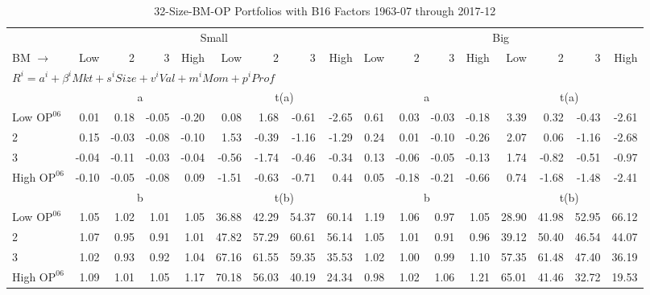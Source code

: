 
\begin{table}[!ht]
\footnotesize
\centering
\caption{32-Size-BM-OP Portfolios with B16 Factors 1963-07 through 2017-12}
\begin{tabular}{lrrrrrrrrrrrrrrrr}
  \toprule
     & \multicolumn{8}{c}{Small} & \multicolumn{8}{c}{Big}  \\
     \cmidrule(r){2-9} \cmidrule(r){10-17}
    BM $\rightarrow$ & Low & 2 & 3 & High & Low & 2 & 3 & High & Low & 2 & 3 & High & Low & 2 & 3 & High  \\ 
  \midrule
  \multicolumn{17}{l}{$R^i=a^i+\beta^iMkt+s^iSize+v^iVal+m^iMom+p^iProf$}  \\
  
     & \multicolumn{4}{c}{a} & \multicolumn{4}{c}{t(a)}  & \multicolumn{4}{c}{a} & \multicolumn{4}{c}{t(a)}   \\
     \cmidrule(r){2-5} \cmidrule(r){6-9}  \cmidrule(r){10-13} \cmidrule(r){14-17} 
    Low $\text{OP}^{06}$  & 0.01  & 0.18  & -0.05  & -0.20  & 0.08  & 1.68  & -0.61  & -2.65  & 0.61  & 0.03  & -0.03  & -0.18  & 3.39  & 0.32  & -0.43  & -2.61   \\
    2  & 0.15  & -0.03  & -0.08  & -0.10  & 1.53  & -0.39  & -1.16  & -1.29  & 0.24  & 0.01  & -0.10  & -0.26  & 2.07  & 0.06  & -1.16  & -2.68   \\
    3  & -0.04  & -0.11  & -0.03  & -0.04  & -0.56  & -1.74  & -0.46  & -0.34  & 0.13  & -0.06  & -0.05  & -0.13  & 1.74  & -0.82  & -0.51  & -0.97   \\
    High $\text{OP}^{06}$  & -0.10  & -0.05  & -0.08  & 0.09  & -1.51  & -0.63  & -0.71  & 0.44  & 0.05  & -0.18  & -0.21  & -0.66  & 0.74  & -1.68  & -1.48  & -2.41   \\
    
  
     & \multicolumn{4}{c}{b} & \multicolumn{4}{c}{t(b)}  & \multicolumn{4}{c}{b} & \multicolumn{4}{c}{t(b)}   \\
     \cmidrule(r){2-5} \cmidrule(r){6-9}  \cmidrule(r){10-13} \cmidrule(r){14-17} 
    Low $\text{OP}^{06}$  & 1.05  & 1.02  & 1.01  & 1.05  & 36.88  & 42.29  & 54.37  & 60.14  & 1.19  & 1.06  & 0.97  & 1.05  & 28.90  & 41.98  & 52.95  & 66.12   \\
    2  & 1.07  & 0.95  & 0.91  & 1.01  & 47.82  & 57.29  & 60.61  & 56.14  & 1.05  & 1.01  & 0.91  & 0.96  & 39.12  & 50.40  & 46.54  & 44.07   \\
    3  & 1.02  & 0.93  & 0.92  & 1.04  & 67.16  & 61.55  & 59.35  & 35.53  & 1.02  & 1.00  & 0.99  & 1.10  & 57.35  & 61.48  & 47.40  & 36.19   \\
    High $\text{OP}^{06}$  & 1.09  & 1.01  & 1.05  & 1.17  & 70.18  & 56.03  & 40.19  & 24.34  & 0.98  & 1.02  & 1.06  & 1.21  & 65.01  & 41.46  & 32.72  & 19.53   \\
    

\end{tabular}
\end{table}
